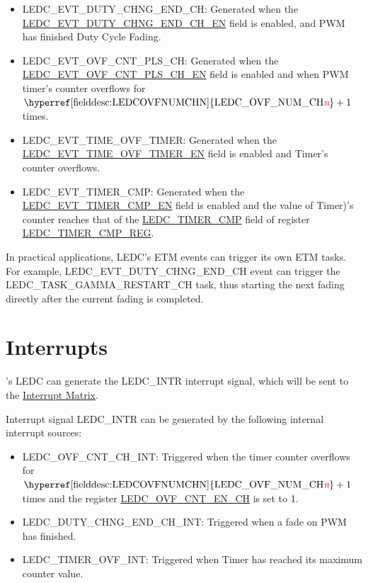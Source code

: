 \documentclass[main\_\_EN.tex]{subfiles}
\begin{document}
\begin{itemize}
    \item LEDC\_EVT\_DUTY\_CHNG\_END\_CH: Generated when the  \hyperref[fielddesc:LEDCEVTDUTYCHNGENDCHNEN]{LEDC\_EVT\_DUTY\_CHNG\_END\_CH\_EN} field is enabled, and PWM has finished Duty Cycle Fading.
    \item LEDC\_EVT\_OVF\_CNT\_PLS\_CH: Generated when the  \hyperref[fielddesc:LEDCEVTOVFCNTPLSCHNEN]{LEDC\_EVT\_OVF\_CNT\_PLS\_CH\_EN} field is enabled and when PWM timer's counter overflows for $ \textrm{\hyperref[fielddesc:LEDCOVFNUMCHN]{LEDC\_OVF\_NUM\_CH\regindex{n}}} + 1 $ times.
    \item LEDC\_EVT\_TIME\_OVF\_TIMER: Generated when the \hyperref[fielddesc:LEDCEVTTIMEOVFTIMERNEN]{LEDC\_EVT\_TIME\_OVF\_TIMER\_EN} field is enabled and Timer's counter overflows.
    \item LEDC\_EVT\_TIMER\_CMP: Generated when the \hyperref[fielddesc:LEDCEVTTIMERNCMPEN]{LEDC\_EVT\_TIMER\_CMP\_EN} field is enabled and the value of Timer)'s counter reaches that of the \hyperref[fielddesc:LEDCTIMERNCMP]{LEDC\_TIMER\_CMP} field of register \hyperref[regdesc:LEDCTIMERNCMPREG]{LEDC\_TIMER\_CMP\_REG}.
\end{itemize}

In practical applications, LEDC's ETM events can trigger its own ETM tasks. For example, LEDC\_EVT\_DUTY\_CHNG\_END\_CH event can trigger the LEDC\_TASK\_GAMMA\_RESTART\_CH task, thus starting the next fading directly after the current fading is completed.

\section{Interrupts}

\chipname{}'s LEDC can generate the LEDC\_INTR interrupt signal, which will be sent to the \hyperref[mod:intmtrx]{Interrupt Matrix}.

Interrupt signal LEDC\_INTR can be generated by the following internal interrupt sources:

\begin{itemize}
\item \label{int:ledc-ovf-cnt}LEDC\_OVF\_CNT\_CH\_INT: Triggered when the timer counter overflows for $ \textrm{\hyperref[fielddesc:LEDCOVFNUMCHN]{LEDC\_OVF\_NUM\_CH\regindex{n}}} + 1 $ times and the register \hyperref[fielddesc:LEDCOVFCNTENCHN]{LEDC\_OVF\_CNT\_EN\_CH} is set to 1.
\item \label{int:ledc-duty-chng-end}LEDC\_DUTY\_CHNG\_END\_CH\_INT: Triggered when a fade on PWM  has finished.
\item \label{int:ledc-timer-ovf}LEDC\_TIMER\_OVF\_INT: Triggered when Timer has reached its maximum counter value.
\end{itemize}
\end{document}
